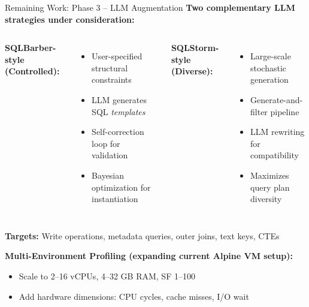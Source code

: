 \documentclass[aspectratio=169]{beamer}
\begin{document}
\begin{frame}{Remaining Work: Phase 3 -- LLM Augmentation}
    \textbf{Two complementary LLM strategies under consideration:}
    
    \vspace{0.2cm}
    \begin{columns}
        \textbf{SQLBarber-style (Controlled):}
        \begin{itemize}
            \item User-specified structural constraints
            \item LLM generates SQL \emph{templates}
            \item Self-correction loop for validation
            \item Bayesian optimization for instantiation
        \end{itemize}
        
        \textbf{SQLStorm-style (Diverse):}
        \begin{itemize}
            \item Large-scale stochastic generation
            \item Generate-and-filter pipeline
            \item LLM rewriting for compatibility
            \item Maximizes query plan diversity
        \end{itemize}
    \end{columns}
    
    \vspace{0.3cm}
    \textbf{Targets:} Write operations, metadata queries, outer joins, text keys, CTEs
    
    \vspace{0.2cm}
    \textbf{Multi-Environment Profiling (expanding current Alpine VM setup):}
    \begin{itemize}
        \item Scale to 2--16 vCPUs, 4--32 GB RAM, SF 1--100
        \item Add hardware dimensions: CPU cycles, cache misses, I/O wait
    \end{itemize}
\end{frame}
\end{document}
